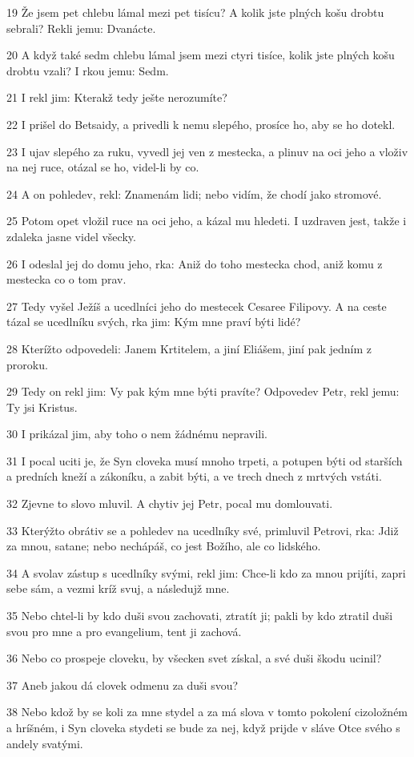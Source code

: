 \par 19 Že jsem pet chlebu lámal mezi pet tisícu? A kolik jste plných košu drobtu sebrali? Rekli jemu: Dvanácte.
\par 20 A když také sedm chlebu lámal jsem mezi ctyri tisíce, kolik jste plných košu drobtu vzali? I rkou jemu: Sedm.
\par 21 I rekl jim: Kterakž tedy ješte nerozumíte?
\par 22 I prišel do Betsaidy, a privedli k nemu slepého, prosíce ho, aby se ho dotekl.
\par 23 I ujav slepého za ruku, vyvedl jej ven z mestecka, a plinuv na oci jeho a vloživ na nej ruce, otázal se ho, videl-li by co.
\par 24 A on pohledev, rekl: Znamenám lidi; nebo vidím, že chodí jako stromové.
\par 25 Potom opet vložil ruce na oci jeho, a kázal mu hledeti. I uzdraven jest, takže i zdaleka jasne videl všecky.
\par 26 I odeslal jej do domu jeho, rka: Aniž do toho mestecka chod, aniž komu z mestecka co o tom prav.
\par 27 Tedy vyšel Ježíš a ucedlníci jeho do mestecek Cesaree Filipovy. A na ceste tázal se ucedlníku svých, rka jim: Kým mne praví býti lidé?
\par 28 Kterížto odpovedeli: Janem Krtitelem, a jiní Eliášem, jiní pak jedním z proroku.
\par 29 Tedy on rekl jim: Vy pak kým mne býti pravíte? Odpovedev Petr, rekl jemu: Ty jsi Kristus.
\par 30 I prikázal jim, aby toho o nem žádnému nepravili.
\par 31 I pocal uciti je, že Syn cloveka musí mnoho trpeti, a potupen býti od starších a predních kneží a zákoníku, a zabit býti, a ve trech dnech z mrtvých vstáti.
\par 32 Zjevne to slovo mluvil. A chytiv jej Petr, pocal mu domlouvati.
\par 33 Kterýžto obrátiv se a pohledev na ucedlníky své, primluvil Petrovi, rka: Jdiž za mnou, satane; nebo nechápáš, co jest Božího, ale co lidského.
\par 34 A svolav zástup s ucedlníky svými, rekl jim: Chce-li kdo za mnou prijíti, zapri sebe sám, a vezmi kríž svuj, a následujž mne.
\par 35 Nebo chtel-li by kdo duši svou zachovati, ztratít ji; pakli by kdo ztratil duši svou pro mne a pro evangelium, tent ji zachová.
\par 36 Nebo co prospeje cloveku, by všecken svet získal, a své duši škodu ucinil?
\par 37 Aneb jakou dá clovek odmenu za duši svou?
\par 38 Nebo kdož by se koli za mne stydel a za má slova v tomto pokolení cizoložném a hríšném, i Syn cloveka stydeti se bude za nej, když prijde v sláve Otce svého s andely svatými.

